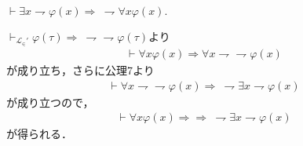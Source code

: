 	\begin{screen}
		$\vdash \exists x \rightharpoondown \varphi(x) 
		\Longrightarrow\ \rightharpoondown \forall x \varphi(x).$
	\end{screen}
	
	$\vdash_{\mathcal{L}_{\in}'} \varphi(\tau) \Longrightarrow\ 
	\rightharpoondown \rightharpoondown \varphi(\tau)$より
	\begin{align}
		\vdash \forall x \varphi(x) \Longrightarrow
		\forall x \rightharpoondown \rightharpoondown \varphi(x)
	\end{align}
	が成り立ち，さらに公理7より
	\begin{align}
		\vdash \forall x \rightharpoondown \rightharpoondown \varphi(x)
		\Longrightarrow\ \rightharpoondown \exists x \rightharpoondown \varphi(x)
	\end{align}
	が成り立つので，
	\begin{align}
		\vdash \forall x \varphi(x) \Longrightarrow
		\Longrightarrow\ \rightharpoondown \exists x \rightharpoondown \varphi(x)
	\end{align}
	が得られる．